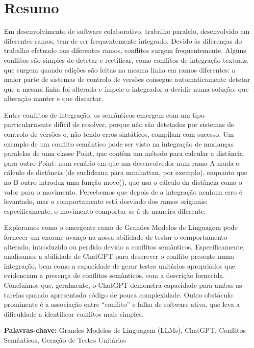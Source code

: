 \chapter*{Resumo}

Em desenvolvimento de software colaborativo, trabalho paralelo, desenvolvido em diferentes ramos, tem de ser frequentemente integrado. Devido às diferenças do trabalho efetuado nos diferentes ramos, conflitos surgem frequentemente. Alguns conflitos são simples de detetar e rectificar, como conflitos de integração textuais, que surgem quando edições são feitas na mesma linha em ramos diferentes: a maior parte de sistemas de controlo de versões consegue automaticamente detetar que a mesma linha foi alterada e impele o integrador a decidir numa solução: que alteração manter e que discartar.

Entre conflitos de integração, os semânticos emergem com um tipo particularmente difícil de resolver, porque não são detetados por sistemas de controlo de versões e, não tendo erros sintáticos, compilam com sucesso. 
Um exemplo de um conflito semântico pode ser visto na integração de mudanças paralelas de uma classe Point, que contêm um método para calcular a distância para outro Point: num cenário em que um desenvolvedor num ramo A muda o cálculo de distância (de euclideana para manhattan, por exemplo), enquanto que no B outro introduz uma função move(), que usa o cálculo da distância como o valor para o movimento. Percebemos que depois de a integração nenhum erro é levantado, mas o comportamento está desviado dos ramos originais: especificamente, o movimento comportar-se-á de maneira diferente.

Exploramos como o emergente ramo de Grandes Modelos de Linguagem pode fornecer um enorme avanço na nossa abilidade de testar o comportamento alterado, introduzido ou perdido devido a conflitos semânticos.
Especificamente, analisamos a abilidade de ChatGPT para descrever o conflito presente numa integração, bem como a capacidade de gerar testes unitários apropriados que evidenciam a presença de conflitos semânticos, com a descrição fornecida.
Concluímos que, geralmente, o ChatGPT demonstra capacidade para ambas as tarefas quando apresentado código de pouca complexidade. Outro obstáculo prominente é a associação entre ``conflito'' e falha de software ativa, que leva a 
dificuldade a identificar conflitos mais simples.

\bigskip\noindent
\textbf{Palavras-chave:} Grandes Modelos de Linguagem (LLMs), ChatGPT, Conflitos Semânticos, Geração de Testes Unitários

